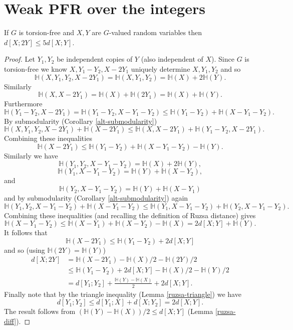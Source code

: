 \chapter{Weak PFR over the integers}

\begin{lemma}\label{torsion-free-doubling}\leanok
If $G$ is torsion-free and $X,Y$ are $G$-valued random variables then $d[X;2Y]\leq 5d[X;Y]$.
\end{lemma}
\begin{proof}
Let $Y_1,Y_2$ be independent copies of $Y$ (also independent of $X$). Since $G$ is torsion-free we know $X,Y_1-Y_2,X-2Y_1$ uniquely determine $X,Y_1,Y_2$ and so
\[\mathbb{H}(X,Y_1,Y_2,X-2Y_1)=\mathbb{H}(X,Y_1,Y_2)=\mathbb{H}(X)+2\mathbb{H}(Y).\]
Similarly
\[\mathbb{H}(X,X-2Y_1)=\mathbb{H}(X)+\mathbb{H}(2Y_1)=\mathbb{H}(X)+\mathbb{H}(Y).\]
Furthermore
\[\mathbb{H}(Y_1-Y_2,X-2Y_1)=\mathbb{H}(Y_1-Y_2,X-Y_1-Y_2)\leq \mathbb{H}(Y_1-Y_2)+\mathbb{H}(X-Y_1-Y_2).\]
By submodularity (Corollary \ref{alt-submodularity})
\[\mathbb{H}(X,Y_1,Y_2,X-2Y_1)+\mathbb{H}(X-2Y_1)\leq \mathbb{H}(X,X-2Y_1)+\mathbb{H}(Y_1-Y_2,X-2Y_1).\]
Combining these inequalities
\[\mathbb{H}(X-2Y_1)\leq \mathbb{H}(Y_1-Y_2)+\mathbb{H}(X-Y_1-Y_2)-\mathbb{H}(Y).\]
Similarly we have
\[\mathbb{H}(Y_1,Y_2,X-Y_1-Y_2)=\mathbb{H}(X)+2\mathbb{H}(Y),\]
\[\mathbb{H}(Y_1,X-Y_1-Y_2)=\mathbb{H}(Y)+\mathbb{H}(X-Y_2),\]
and
\[\mathbb{H}(Y_2,X-Y_1-Y_2)=\mathbb{H}(Y)+\mathbb{H}(X-Y_1)\]
and by submodularity (Corollary \ref{alt-submodularity}) again
\[\mathbb{H}(Y_1,Y_2,X-Y_1-Y_2)+ \mathbb{H}(X-Y_1-Y_2)\leq \mathbb{H}(Y_1,X-Y_1-Y_2)+\mathbb{H}(Y_2,X-Y_1-Y_2).\]
Combining these inequalities (and recalling the definition of Ruzsa distance) gives
\[\mathbb{H}(X-Y_1-Y_2)\leq \mathbb{H}(X-Y_1)+\mathbb{H}(X-Y_2)-\mathbb{H}(X)=2d[X;Y]+\mathbb{H}(Y).\]
It follows that
\[\mathbb{H}(X-2Y_1)\leq \mathbb{H}(Y_1-Y_2)+2d[X;Y]\]
and so (using $\mathbb{H}(2Y)=\mathbb{H}(Y)$)
\begin{align*}
d[X;2Y]
&=\mathbb{H}(X-2Y_1)-\mathbb{H}(X)/2-\mathbb{H}(2Y)/2\\
&\leq \mathbb{H}(Y_1-Y_2)+2d[X;Y]-\mathbb{H}(X)/2-\mathbb{H}(Y)/2\\
&= d[Y_1;Y_2]+\frac{\mathbb{H}(Y)-\mathbb{H}(X)}{2}+2d[X;Y].
\end{align*}
Finally note that by the triangle inequality (Lemma \ref{ruzsa-triangle}) we have
\[d[Y_1;Y_2]\leq d[Y_1;X]+d[X;Y_2]=2d[X;Y].\]
The result follows from $(\mathbb{H}(Y)-\mathbb{H}(X))/2\leq d[X;Y]$ (Lemma \ref{ruzsa-diff}).
\end{proof}

